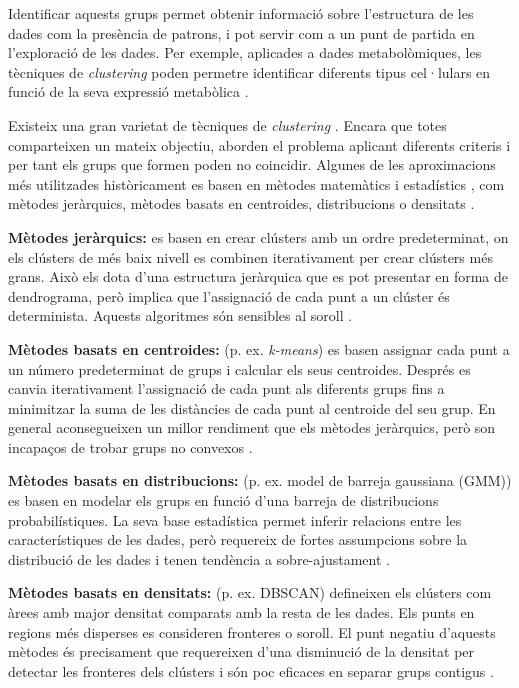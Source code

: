 \documentclass[CAT,BIB]{TFUOC}%
\begin{document}
        Identificar aquests grups permet obtenir informació sobre l'estructura de les dades com la presència de patrons, i pot servir com a un punt de partida en l'exploració de les dades. Per exemple, aplicades a dades metabolòmiques, les tècniques de \textit{clustering} poden permetre identificar diferents tipus cel·lulars en funció de la seva expressió metabòlica \citep{Blekherman2011}.

        Existeix una gran varietat de tècniques de \textit{clustering} \citep{Karim2021, Min2018, Blekherman2011, Masood2015}. Encara que totes comparteixen un mateix objectiu, aborden el problema aplicant diferents criteris i per tant els grups que formen poden no coincidir. Algunes de les aproximacions més utilitzades històricament es basen en mètodes matemàtics i estadístics \citep{Masood2015}, com mètodes jeràrquics, mètodes basats en centroides, distribucions o densitats \citep{Karim2021}.

        \textbf{Mètodes jeràrquics:} es basen en crear clústers amb un ordre predeterminat, on els clústers de més baix nivell es combinen iterativament per crear clústers més grans. Això els dota d'una estructura jeràrquica que es pot presentar en forma de dendrograma, però implica que l'assignació de cada punt a un clúster és determinista. Aquests algoritmes són sensibles al soroll \citep{Karim2021}.

        \textbf{Mètodes basats en centroides:} (p. ex. \textit{k-means}) es basen assignar cada punt a un número predeterminat de grups i calcular els seus centroides. Després es canvia iterativament l'assignació de cada punt als diferents grups fins a minimitzar la suma de les distàncies de cada punt al centroide del seu grup. En general aconsegueixen un millor rendiment que els mètodes jeràrquics, però son incapaços de trobar grups no convexos \citep{Karim2021}.

        \textbf{Mètodes basats en distribucions:} (p. ex. model de barreja gaussiana (GMM)) es basen en modelar els grups en funció d'una barreja de distribucions probabilístiques. La seva base estadística permet inferir relacions entre les característiques de les dades, però requereix de fortes assumpcions sobre la distribució de les dades i tenen tendència a sobre-ajustament \citep{Karim2021}.

        \textbf{Mètodes basats en densitats:} (p. ex. DBSCAN) defineixen els clústers com àrees amb major densitat comparats amb la resta de les dades. Els punts en regions més disperses es consideren fronteres o soroll. El punt negatiu d'aquests mètodes és precisament que requereixen d'una disminució de la densitat per detectar les fronteres dels clústers i són poc eficaces en separar grups contigus \citep{Karim2021}.
\end{document}
